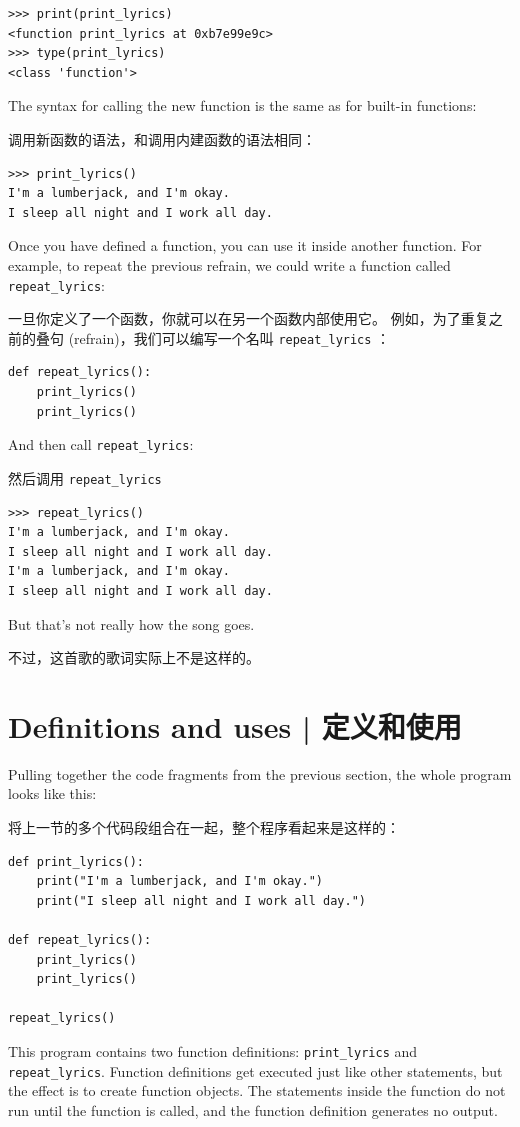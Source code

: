 \begin{lstlisting}
>>> print(print_lyrics)
<function print_lyrics at 0xb7e99e9c>
>>> type(print_lyrics)
<class 'function'>
\end{lstlisting}
%
The syntax for calling the new function is the same as
for built-in functions:

调用新函数的语法，和调用内建函数的语法相同：

\begin{lstlisting}
>>> print_lyrics()
I'm a lumberjack, and I'm okay.
I sleep all night and I work all day.
\end{lstlisting}
%
Once you have defined a function, you can use it inside another
function.  For example, to repeat the previous refrain, we could write
a function called \verb"repeat_lyrics":

一旦你定义了一个函数，你就可以在另一个函数内部使用它。
例如，为了重复之前的叠句 (refrain)，我们可以编写一个名叫 \lstinline{repeat_lyrics} ：


\begin{lstlisting}
def repeat_lyrics():
    print_lyrics()
    print_lyrics()
\end{lstlisting}
%
And then call \verb"repeat_lyrics":

然后调用 \lstinline{repeat_lyrics}


\begin{lstlisting}
>>> repeat_lyrics()
I'm a lumberjack, and I'm okay.
I sleep all night and I work all day.
I'm a lumberjack, and I'm okay.
I sleep all night and I work all day.
\end{lstlisting}
%
But that's not really how the song goes.

不过，这首歌的歌词实际上不是这样的。


%
\section{Definitions and uses  |  定义和使用}

Pulling together the code fragments from the previous section, the
whole program looks like this:

将上一节的多个代码段组合在一起，整个程序看起来是这样的：

\begin{lstlisting}
def print_lyrics():
    print("I'm a lumberjack, and I'm okay.")
    print("I sleep all night and I work all day.")

def repeat_lyrics():
    print_lyrics()
    print_lyrics()

repeat_lyrics()
\end{lstlisting}
%
This program contains two function definitions: \verb"print_lyrics" and
\verb"repeat_lyrics".  Function definitions get executed just like other
statements, but the effect is to create function objects.  The statements
inside the function do not run until the function is called, and
the function definition generates no output.

